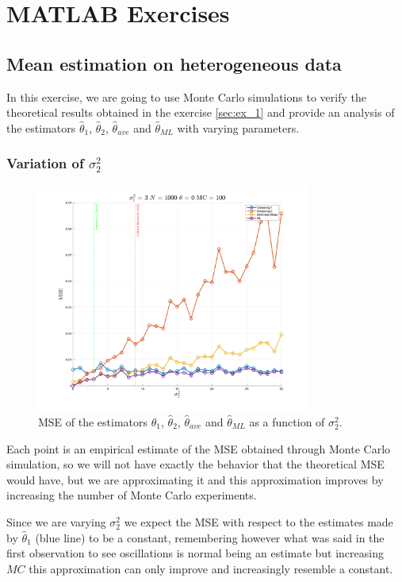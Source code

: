\chapter{MATLAB Exercises}
\section{Mean estimation on heterogeneous data}
In this exercise, we are going to use Monte Carlo simulations to verify the theoretical results obtained in the exercise \ref{sec:ex_1} and provide an analysis of the estimators $\hat\theta_1$, $\hat\theta_2$, $\hat\theta_{ave}$ and $\hat\theta_{ML}$ with varying parameters.

\subsection*{Variation of $\sigma_2^2$}
\begin{figure}[H]
    \centering
    \includegraphics[width=0.8\textwidth]{./figures/appendix_a/figure_1.png}
    \caption{MSE of the estimators $\hat\theta_1$, $\hat\theta_2$, $\hat\theta_{ave}$ and $\hat\theta_{ML}$ as a function of $\sigma_2^2$.}
    \label{fig:mean_estimation_heterogeneous_data}
\end{figure}

Each point is an empirical estimate of the MSE obtained through Monte Carlo simulation, so we will not have exactly the behavior that the theoretical MSE would have, but we are approximating it and this approximation improves by increasing the number of Monte Carlo experiments.

Since we are varying $\sigma_2^2$ we expect the MSE with respect to the estimates made by $\hat \theta _1$ (blue line) to be a constant, remembering however what was said in the first observation to see oscillations is normal being an estimate but increasing $MC$ this approximation can only improve and increasingly resemble a constant.

